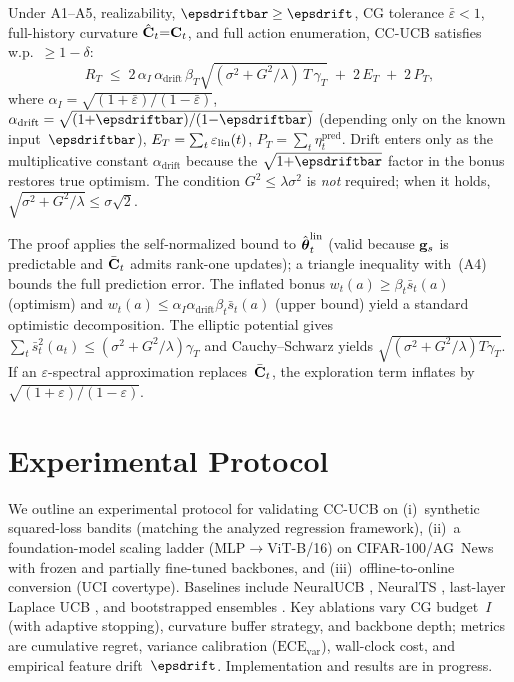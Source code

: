 \documentclass[11pt]{article}
\begin{document}
\begin{theorem}[Informal]\label{thm:2p-regret}
Under A1--A5, realizability, $\epsdriftbar\ge\epsdrift$,
CG tolerance $\bar\varepsilon<1$, full-history curvature
$\hat{\mathbf{C}}_t{=}\mathbf{C}_t$, and full action enumeration,
CC-UCB satisfies w.p.\ $\ge 1{-}\delta$:
\[
  R_T
  \;\le\;
  2\,\alpha_I\,\alpha_{\mathrm{drift}}\,\beta_T
  \sqrt{(\sigma^2{+}G^2/\lambda)\,T\,\gamma_T}
  \;+\;
  2\,E_T
  \;+\;
  2\,P_T,
\]
where
$\alpha_I=\sqrt{(1{+}\bar\varepsilon)/(1{-}\bar\varepsilon)}$,
$\alpha_{\mathrm{drift}}=\sqrt{(1{+}\epsdriftbar)/(1{-}\epsdriftbar)}$
(depending only on the known input~$\epsdriftbar$),
$E_T=\sum_t\varepsilon_{\mathrm{lin}}(t)$,
$P_T=\sum_t\eta_t^{\mathrm{pred}}$.
Drift enters only as the multiplicative constant
$\alpha_{\mathrm{drift}}$ because the
$\sqrt{1{+}\epsdriftbar}$ factor in the bonus restores true optimism.
The condition $G^2\le\lambda\sigma^2$ is \emph{not} required;
when it holds, $\sqrt{\sigma^2{+}G^2/\lambda}\le\sigma\sqrt{2}$.
\end{theorem}
The proof applies the self-normalized bound
\citep{abbasi2011improved} to $\hat{\boldsymbol{\theta}}_t^{\mathrm{lin}}$ (valid
because $\mathbf{g}_s$ is predictable and $\bar{\mathbf{C}}_t$ admits rank-one updates);
a triangle inequality with~(A4) bounds the full prediction error.
The inflated bonus $w_t(a)\ge\beta_t\bar s_t(a)$ (optimism) and
$w_t(a)\le\alpha_I\alpha_{\mathrm{drift}}\beta_t\bar s_t(a)$
(upper bound) yield a standard optimistic decomposition.
The elliptic potential gives
$\sum_t\bar s_t^2(a_t)\le(\sigma^2{+}G^2/\lambda)\gamma_T$ and
Cauchy--Schwarz yields
$\sqrt{(\sigma^2{+}G^2/\lambda)T\gamma_T}$.
If an $\varepsilon$-spectral approximation replaces~$\bar{\mathbf{C}}_t$,
the exploration term inflates by
$\sqrt{(1{+}\varepsilon)/(1{-}\varepsilon)}$.

\section{Experimental Protocol}

We outline an experimental protocol for validating CC-UCB on
(i)~synthetic squared-loss bandits (matching the analyzed regression
framework),
(ii)~a foundation-model scaling ladder (MLP$\to$ViT-B/16) on CIFAR-100/AG~News
with frozen and partially fine-tuned backbones,
and (iii)~offline-to-online conversion (UCI covertype).
Baselines include NeuralUCB \citep{zhou2020neural}, NeuralTS
\citep{zhang2021neural}, last-layer Laplace UCB
\citep{ritter2018scalable,daxberger2021laplace},
and bootstrapped ensembles \citep{osband2016deep}.
Key ablations vary CG budget~$I$ (with adaptive stopping),
curvature buffer strategy, and backbone depth;
metrics are cumulative regret, variance calibration
($\mathrm{ECE}_{\mathrm{var}}$), wall-clock cost, and empirical
feature drift~$\epsdrift$.
Implementation and results are in progress.



\end{document}
